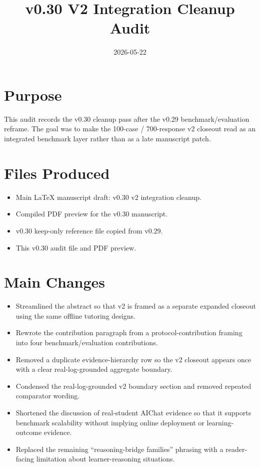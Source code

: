 \documentclass[11pt]{article}
\title{v0.30 V2 Integration Cleanup Audit}
\author{}
\date{2026-05-22}
\begin{document}
\maketitle

\section{Purpose}

This audit records the v0.30 cleanup pass after the v0.29 benchmark/evaluation reframe. The goal was to make the 100-case / 700-response v2 closeout read as an integrated benchmark layer rather than as a late manuscript patch.

\section{Files Produced}

\begin{itemize}
  \item Main LaTeX manuscript draft: v0.30 v2 integration cleanup.
  \item Compiled PDF preview for the v0.30 manuscript.
  \item v0.30 keep-only reference file copied from v0.29.
  \item This v0.30 audit file and PDF preview.
\end{itemize}

\section{Main Changes}

\begin{itemize}
  \item Streamlined the abstract so that v2 is framed as a separate expanded closeout using the same offline tutoring designs.
  \item Rewrote the contribution paragraph from a protocol-contribution framing into four benchmark/evaluation contributions.
  \item Removed a duplicate evidence-hierarchy row so the v2 closeout appears once with a clear real-log-grounded aggregate boundary.
  \item Condensed the real-log-grounded v2 boundary section and removed repeated comparator wording.
  \item Shortened the discussion of real-student AIChat evidence so that it supports benchmark scalability without implying online deployment or learning-outcome evidence.
  \item Replaced the remaining ``reasoning-bridge families'' phrasing with a reader-facing limitation about learner-reasoning situations.
\end{itemize}
\end{document}
